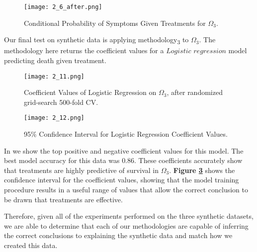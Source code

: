 \begin{figure}[H]
  \texttt{[image: 2\_6\_after.png]}
  \caption{Conditional Probability of Symptoms Given Treatments for $\Omega_3$.}
    \label{fig:2_6_after}
\end{figure}


Our final test on synthetic data is applying methodology\textsubscript{3} to $\Omega_3$. The methodology here returns the coefficient values for a $Logistic$ $regression$ model predicting death given treatment.

\begin{figure}[H]
  \texttt{[image: 2\_11.png]}
  \caption{Coefficient Values of Logistic Regression on $\Omega_3$, after randomized grid-search 500-fold CV.}
    \label{fig:2_11}
\end{figure}

\begin{figure}[H]
  \texttt{[image: 2\_12.png]}
  \caption{95\% Confidence Interval for Logistic Regression Coefficient Values.}
    \label{fig:2_12}
\end{figure}

In  we show the top positive and negative coefficient values for this model. The best model accuracy for this data was $0.86$. These coefficients accurately show that treatments are highly predictive of survival in $\Omega_3$. \textbf{Figure \ref{fig:2_12}} shows the confidence interval for the coefficient values, showing that the model training procedure results in a useful range of values that allow the correct conclusion to be drawn that treatments are effective.

Therefore, given all of the experiments performed on the three synthetic datasets, we are able to determine that each of our methodologies are capable of inferring the correct conclusions to explaining the synthetic data and match how we created this data.
